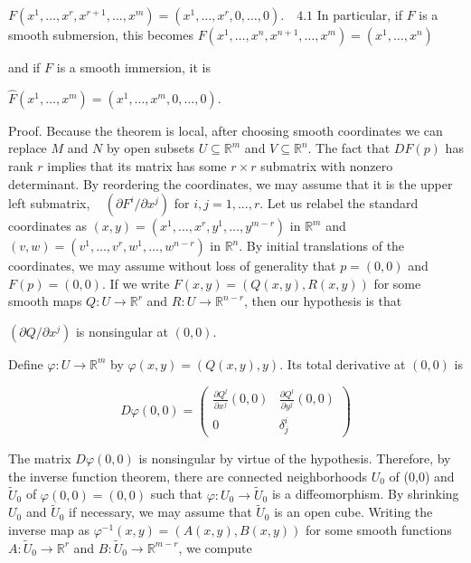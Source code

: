 \(F(x^{1},\dots,x^{r},x^{r+1},\dots,x^{m})=(x^{1},\dots,x^{r},0,\dots,0).\quad \text{4.1}\)
In particular, if \( F \) is a smooth submersion, this becomes 
\( F(x^{1},\dots,x^{n},x^{n+1},\dots,x^{m})=(x^{1},\dots,x^{n}) \)

and if \(F\) is a smooth immersion, it is 

\(\hat{F}(x^{1},\dots,x^{m})=(x^{1},\dots,x^{m},0,\dots,0).\)

Proof. Because the theorem is local, after choosing smooth coordinates we can replace \( M \) and \( N \) by open subsets \( U\subseteq\mathbb{R}^{m} \) and \(V\subseteq\mathbb{R}^{n}\). The fact that \(DF(p)\) has rank \(r\) implies that its matrix has some \(r\times r\) submatrix with nonzero determinant. 
By reordering the coordinates, we may assume that it is the upper left submatrix,   
\((\partial F^i / \partial x^j)\) for \(i,j=1,...,r\). Let us relabel the standard coordinates as \((x,y)= (x^{1},...,x^{r},y^{1},...,y^{m-r})\) in \(\mathbb{R}^{m}\) and 
\((v,w)=(v^{1},\dots,v^{r},w^{1},\dots,w^{n-r})\) in \(\mathbb{R}^{n}\). By initial translations of the coordinates, we may assume without loss of generality that \(p=(0,0)\) and \(F(p)=(0,0)\). If we write \(F(x,y)=(Q(x,y),R(x,y))\) for some smooth maps \(Q:U\rightarrow\mathbb{R}^{r}\) and \(R: U\rightarrow\mathbb{R}^{n-r}\), then our hypothesis is that   

\((\partial Q / \partial x^j)\) is nonsingular at \((0,0)\). 

Define \(\varphi: U \rightarrow \mathbb{R}^m\) by \(\varphi(x,y)=(Q(x,y),y)\). Its total derivative at \((0,0)\) is 

\[D\varphi(0,0)=
\begin{pmatrix}
\frac{\partial Q^{l}}{\partial x^{j}}(0,0) & \frac{\partial Q^{l}}{\partial y^{j}}(0,0) \\
0 & \delta_{j}^{i}
\end{pmatrix}
\] 

The matrix \(D\varphi(0,0)\) is nonsingular by virtue of the hypothesis. 
Therefore, by the inverse function theorem, there are connected neighborhoods \(U_{0}\) of (0,0) and \(\tilde{U}_{0}\) of \(\varphi(0,0)=(0,0)\) such that \(\varphi: U_0 \rightarrow \tilde{U}_0\) is a diffeomorphism. 
By shrinking \(U_{0}\) and \(\tilde{U}_{0}\) if necessary, we may assume that \(\tilde{U}_{0}\) is an open cube. 
Writing the inverse map as \(\varphi^{-1}(x,y)=(A(x,y),B(x,y))\) for some smooth functions 
\(A: \tilde{U}_0 \rightarrow \mathbb{R}^r\) and \(B:\tilde{U}_{0}\rightarrow\mathbb{R}^{m-r}\), we compute

